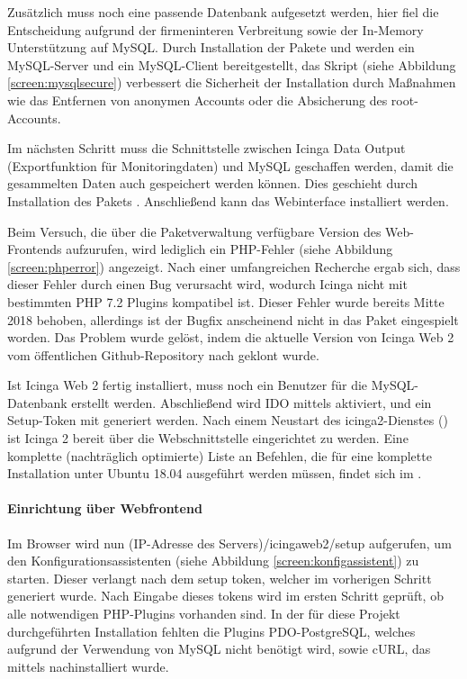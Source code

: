 Zusätzlich muss noch eine passende Datenbank aufgesetzt werden, hier fiel die Entscheidung aufgrund der firmeninteren Verbreitung sowie der In-Memory Unterstützung auf MySQL. Durch Installation der Pakete  und  werden ein MySQL-Server und ein MySQL-Client bereitgestellt, das Skript  (siehe Abbildung \ref{screen:mysqlsecure}) verbessert die Sicherheit der Installation durch Maßnahmen wie das Entfernen von anonymen Accounts oder die Absicherung des root-Accounts.

Im nächsten Schritt muss die Schnittstelle zwischen \glqq{}Icinga Data Output\grqq{} (Exportfunktion für Monitoringdaten) und MySQL geschaffen werden, damit die gesammelten Daten auch gespeichert werden können. Dies geschieht durch Installation des Pakets . Anschließend kann das Webinterface  installiert werden.

Beim Versuch, die über die Paketverwaltung verfügbare Version des Web-Frontends aufzurufen, wird lediglich ein \ac{PHP}-Fehler (siehe Abbildung \ref{screen:phperror}) angezeigt. Nach einer umfangreichen Recherche ergab sich, dass dieser Fehler durch einen Bug verursacht wird, wodurch \glqq{}Icinga\grqq{} nicht mit bestimmten \ac{PHP} 7.2 Plugins kompatibel ist. Dieser Fehler wurde bereits Mitte 2018 behoben, allerdings ist der Bugfix anscheinend nicht in das Paket eingespielt worden. Das Problem wurde gelöst, indem die aktuelle Version von \glqq{}Icinga Web 2\grqq{} vom öffentlichen Github-Repository nach  geklont wurde.

Ist \glqq{}Icinga Web 2\grqq{} fertig installiert, muss noch ein Benutzer für die MySQL-Datenbank erstellt werden. Abschließend wird IDO mittels  aktiviert, und ein Setup-Token mit  generiert werden. Nach einem Neustart des icinga2-Dienstes () ist \glqq{}Icinga 2\grqq{} bereit über die Webschnittstelle eingerichtet zu werden. Eine komplette (nachträglich optimierte) Liste an Befehlen, die für eine komplette Installation unter Ubuntu 18.04 ausgeführt werden müssen, findet sich im .

\paragraph{Einrichtung über Webfrontend}
Im Browser wird nun (IP-Adresse des Servers)/icingaweb2/setup aufgerufen, um den Konfigurationsassistenten (siehe Abbildung \ref{screen:konfigassistent}) zu starten. Dieser verlangt nach dem setup token, welcher im vorherigen Schritt generiert wurde. Nach Eingabe dieses tokens wird im ersten Schritt geprüft, ob alle notwendigen \ac{PHP}-Plugins vorhanden sind. In der für diese Projekt durchgeführten Installation fehlten die Plugins \glqq{}PDO-PostgreSQL\grqq{}, welches aufgrund der Verwendung von MySQL nicht benötigt wird, sowie \glqq{}cURL\grqq{}, das mittels  nachinstalliert wurde.

